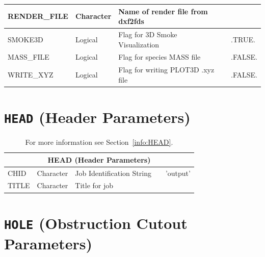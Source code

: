 \documentclass[11pt]{book}
\begin{document}
\begin{table}[H]
\begin{tabular*}{6.5in}{@{\extracolsep{\fill}}|l|l|l|l|l|}
{\ct RENDER\_FILE}              & Character    & Name of render file from dxf2fds  &           &                       \\ \hline
{\ct SMOKE3D}                   & Logical      & Flag for 3D Smoke Visualization   &           & {\ct .TRUE.}          \\ \hline
{\ct MASS\_FILE}                & Logical      & Flag for species {\ct MASS} file  &           & {\ct .FALSE.}         \\ \hline
{\ct WRITE\_XYZ}                & Logical      & Flag for writing PLOT3D .xyz file &           & {\ct .FALSE.}         \\ \hline
\end{tabular*}
\normalsize
\end{table}

\vspace{\baselineskip}

\vfill


\section{\texorpdfstring{{\tt HEAD}}{HEAD} (Header Parameters)}

\hspace{1in}

\begin{table}[H]
\caption{For more information see Section~\ref{info:HEAD}.}\label{tbl:HEAD}
\noindent
\begin{tabular*}{6.5in}{@{\extracolsep{\fill}}|l|l|l|l|l|}
\hline
\multicolumn{5}{|c|}{{\ct HEAD} (Header Parameters)} \\ \hline \hline
{\ct CHID}      & Character   & Job Identification String  &           & {\ct 'output'} \\ \hline
{\ct TITLE}     & Character   & Title for job              &           &                            \\ \hline
\end{tabular*}
\end{table}

\vspace{\baselineskip}

\vfill


\section{\texorpdfstring{{\tt HOLE}}{HOLE} (Obstruction Cutout Parameters)}

\hspace{1in}
\end{document}
